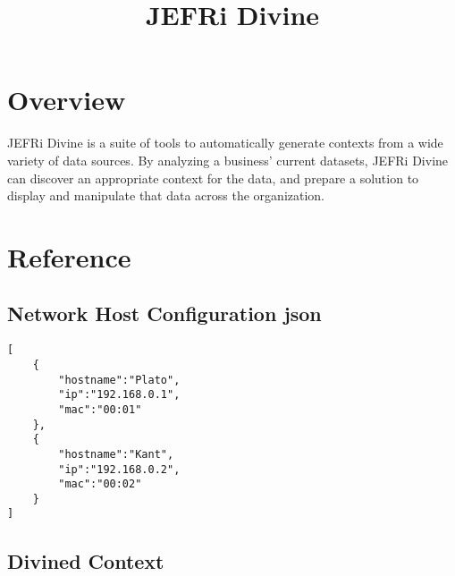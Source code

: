 \documentclass{article}
\begin{document}
\title{JEFRi Divine}
\maketitle
\tableofcontents
\newpage
\linespread{1.6}

\section{Overview}
JEFRi Divine is a suite of tools to automatically generate contexts from a wide variety of data
sources. By analyzing a business' current datasets, JEFRi Divine can discover an appropriate
context for the data, and prepare a solution to display and manipulate that data across the
organization.

\section{Reference}

\subsection{Network Host Configuration json}
\begin{lstlisting}
[
	{
		"hostname":"Plato",
		"ip":"192.168.0.1",
		"mac":"00:01"
	},
	{
		"hostname":"Kant",
		"ip":"192.168.0.2",
		"mac":"00:02"
	}
]
\end{lstlisting}

\subsection{Divined Context}
\begin{lstlisting}

\end{lstlisting}
\end{document}
